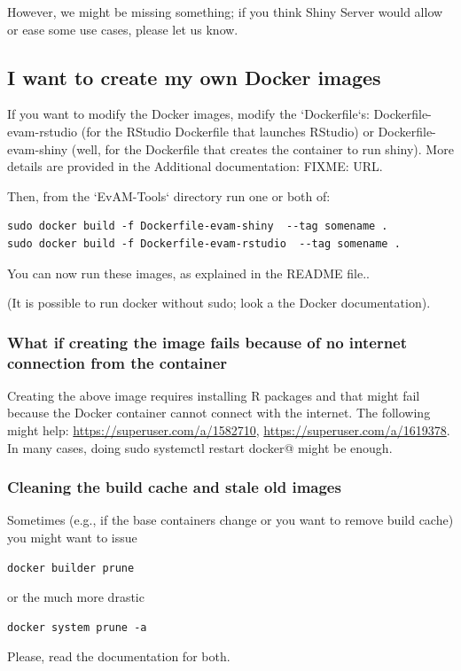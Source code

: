 \documentclass[a4paper,11pt]{article}
\begin{document}
However, we might be missing something; if you think Shiny Server would allow or ease some use cases, please let us know.


\subsection{I want to create my own Docker images}

If you want to modify the Docker images, modify the `Dockerfile`s: Dockerfile-evam-rstudio (for the RStudio Dockerfile that launches RStudio) or Dockerfile-evam-shiny (well, for the Dockerfile that creates the container to run shiny). More details are provided in the Additional documentation: 
FIXME: URL.


Then, from the `EvAM-Tools` directory run one or both of:

\begin{verbatim}
sudo docker build -f Dockerfile-evam-shiny  --tag somename .
sudo docker build -f Dockerfile-evam-rstudio  --tag somename .
\end{verbatim}


You can now run these images, as explained in the README file..

(It is possible to run docker without sudo; look a the Docker documentation).


\subsubsection{What if creating the image fails because of no internet connection from the container}
Creating the above image requires installing R packages and that might fail because the Docker container cannot connect with the internet. The following might help: \url{https://superuser.com/a/1582710}, \url{https://superuser.com/a/1619378}. In many cases, doing
\verb@ sudo systemctl restart docker@ might be enough.


\subsubsection{Cleaning the build cache and stale old images}
Sometimes (e.g., if the base containers change or you want to remove build cache) you might want to issue

\begin{verbatim}
docker builder prune
\end{verbatim}

or the much more drastic

\begin{verbatim}
docker system prune -a

\end{verbatim}
Please, read the documentation for both.
\end{document}
